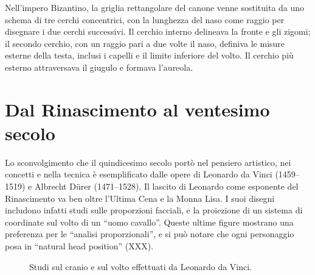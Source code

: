 Nell'impero Bizantino, la griglia rettangolare del canone venne sostituita da uno schema di tre cerchi concentrici, con la lunghezza del naso come raggio per disegnare i due cerchi successivi. Il cerchio interno delineava la fronte e gli zigomi; il secondo cerchio, con un raggio pari a due volte il naso, definiva le misure esterne della testa, inclusi i capelli e il limite inferiore del volto. Il cerchio più esterno attraversava il giugulo e formava l'aureola.

\section{Dal Rinascimento al ventesimo secolo}
Lo sconvolgimento che il quindicesimo secolo portò nel pensiero artistico, nei concetti e nella tecnica è esemplificato dalle opere di Leonardo da Vinci (1459--1519) e Albrecht Dürer (1471--1528). Il lascito di Leonardo come esponente del Rinascimento va ben oltre l'Ultima Cena e la Monna Lisa. I suoi disegni includono infatti studi sulle proporzioni facciali, e la proiezione di un sistema di coordinate sul volto di un ``uomo cavallo''. Queste ultime figure mostrano una preferenza per le ``analisi proporzionali'', e si può notare che ogni personaggio posa in ``natural head position'' (XXX).

\begin{figure}[h!]
\centering
{} \quad
{}
\caption{Studi sul cranio e sul volto effettuati da Leonardo da Vinci.}
\label{fig:leonardo}
\end{figure}

